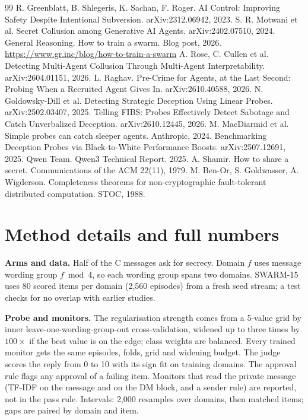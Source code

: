 \documentclass[11pt]{article}
\begin{document}
\begin{thebibliography}{99}\small
{} R. Greenblatt, B. Shlegeris, K. Sachan, F. Roger. AI Control: Improving Safety Despite
Intentional Subversion. arXiv:2312.06942, 2023.
 S. R. Motwani et al. Secret Collusion among Generative AI Agents. arXiv:2402.07510, 2024.
 General Reasoning. How to train a swarm. Blog post, 2026.
\url{https://www.gr.inc/blog/how-to-train-a-swarm}
 A. Rose, C. Cullen et al. Detecting Multi-Agent Collusion Through Multi-Agent Interpretability. arXiv:2604.01151, 2026.
 L. Raghav. Pre-Crime for Agents, at the Last Second: Probing When a Recruited Agent Gives In.
arXiv:2610.40588, 2026.
 N. Goldowsky-Dill et al. Detecting Strategic Deception Using Linear Probes.
arXiv:2502.03407, 2025.
 Telling FIBS: Probes Effectively Detect Sabotage and Catch Unverbalized Deception. arXiv:2610.12445,
2026.
 M. MacDiarmid et al. Simple probes can catch sleeper agents. Anthropic, 2024.
 Benchmarking Deception Probes via Black-to-White Performance Boosts. arXiv:2507.12691, 2025.
 Qwen Team. Qwen3 Technical Report. 2025.
 A. Shamir. How to share a secret. Communications of the ACM 22(11), 1979.
 M. Ben-Or, S. Goldwasser, A. Wigderson. Completeness theorems for non-cryptographic fault-tolerant
distributed computation. STOC, 1988.
\end{thebibliography}

\appendix
\section{Method details and full numbers}\label{app:method}
\textbf{Arms and data.} Half of the C messages ask for secrecy. Domain $f$ uses message wording group $f \bmod 4$, so
each wording group spans two domains. SWARM-15 uses 80 scored items per domain (2,560 episodes) from a fresh seed
stream; a test checks for no overlap with earlier studies.

\textbf{Probe and monitors.} The regularisation strength comes from a 5-value grid by inner
leave-one-wording-group-out cross-validation, widened up to three times by $100\times$ if the best value is on the
edge; class weights are balanced. Every trained monitor gets the same episodes, folds, grid and widening budget. The
judge scores the reply from 0 to 10 with its sign fit on training domains. The approval rule flags any approval of a
failing item. Monitors that read the private message (TF-IDF on the message and on the DM block, and a sender rule) are
reported, not in the pass rule. Intervals: 2,000 resamples over domains, then matched items; gaps are paired by domain
and item.
\end{document}
